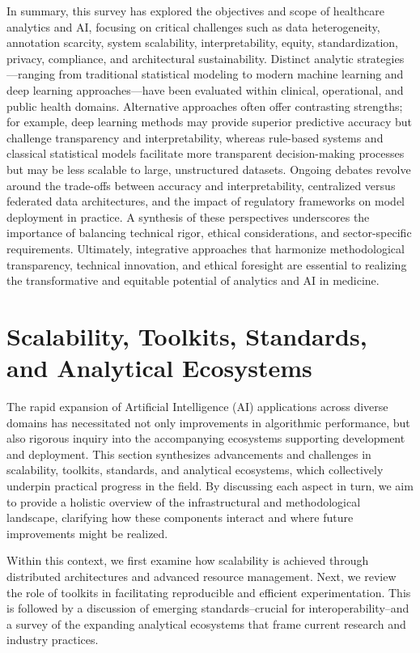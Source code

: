 \documentclass[sigconf]{acmart}
\begin{document}
In summary, this survey has explored the objectives and scope of healthcare analytics and AI, focusing on critical challenges such as data heterogeneity, annotation scarcity, system scalability, interpretability, equity, standardization, privacy, compliance, and architectural sustainability. Distinct analytic strategies—ranging from traditional statistical modeling to modern machine learning and deep learning approaches—have been evaluated within clinical, operational, and public health domains. Alternative approaches often offer contrasting strengths; for example, deep learning methods may provide superior predictive accuracy but challenge transparency and interpretability, whereas rule-based systems and classical statistical models facilitate more transparent decision-making processes but may be less scalable to large, unstructured datasets. Ongoing debates revolve around the trade-offs between accuracy and interpretability, centralized versus federated data architectures, and the impact of regulatory frameworks on model deployment in practice. A synthesis of these perspectives underscores the importance of balancing technical rigor, ethical considerations, and sector-specific requirements. Ultimately, integrative approaches that harmonize methodological transparency, technical innovation, and ethical foresight are essential to realizing the transformative and equitable potential of analytics and AI in medicine.

\section{Scalability, Toolkits, Standards, and Analytical Ecosystems}

The rapid expansion of Artificial Intelligence (AI) applications across diverse domains has necessitated not only improvements in algorithmic performance, but also rigorous inquiry into the accompanying ecosystems supporting development and deployment. This section synthesizes advancements and challenges in scalability, toolkits, standards, and analytical ecosystems, which collectively underpin practical progress in the field. By discussing each aspect in turn, we aim to provide a holistic overview of the infrastructural and methodological landscape, clarifying how these components interact and where future improvements might be realized.

Within this context, we first examine how scalability is achieved through distributed architectures and advanced resource management. Next, we review the role of toolkits in facilitating reproducible and efficient experimentation. This is followed by a discussion of emerging standards--crucial for interoperability--and a survey of the expanding analytical ecosystems that frame current research and industry practices.
\end{document}
